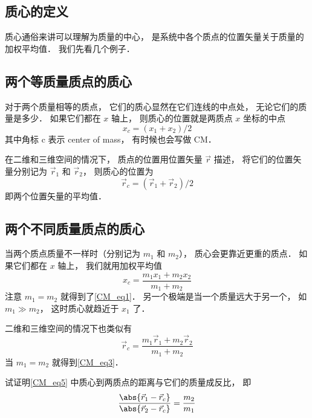 

\subsection{质心的定义}
质心通俗来讲可以理解为质量的中心， 是系统中各个质点的位置矢量关于质量的加权平均值． 我们先看几个例子．

\subsection{两个等质量质点的质心}
对于两个质量相等的质点， 它们的质心显然在它们连线的中点处， 无论它们的质量是多少． 如果它们都在 $x$ 轴上， 则质心的位置就是两质点 $x$ 坐标的中点
\begin{equation}\label{CM_eq2}
x_c = (x_1 + x_2)/2
\end{equation}
其中角标 c 表示 center of mass， 有时候也会写做 CM．

在二维和三维空间的情况下， 质点的位置用位置矢量 $\vec r$ 描述， 将它们的位置矢量分别记为 $\vec r_1$ 和 $\vec r_2$， 则质心的位置为
\begin{equation}\label{CM_eq3}
\vec r_c = (\vec r_1 + \vec r_2)/2
\end{equation}
即两个位置矢量的平均值． %

\subsection{两个不同质量质点的质心}
当两个质点质量不一样时（分别记为 $m_1$ 和 $m_2$）， 质心会更靠近更重的质点． 如果它们都在 $x$ 轴上， 我们就用加权平均值
\begin{equation}
x_c = \frac{m_1 x_1 + m_2 x_2}{m_1 + m_2}
\end{equation}
注意 $m_1 = m_2$ 就得到了\autoref{CM_eq1}． 另一个极端是当一个质量远大于另一个， 如 $m_1 \gg m_2$， 这时质心就趋近于 $x_1$ 了．

二维和三维空间的情况下也类似有
\begin{equation}\label{CM_eq5}
\vec r_c = \frac{m_1 \vec r_1 + m_2 \vec r_2}{m_1 + m_2}
\end{equation}
当 $m_1 = m_2$ 就得到\autoref{CM_eq3}．

\begin{exer}{}
试证明\autoref{CM_eq5} 中质心到两质点的距离与它们的质量成反比， 即
\begin{equation}
\frac{\abs{\vec r_1 - \vec r_c}}{\abs{\vec r_2 - \vec r_c}} = \frac{m_2}{m_1}
\end{equation}
\end{exer}

